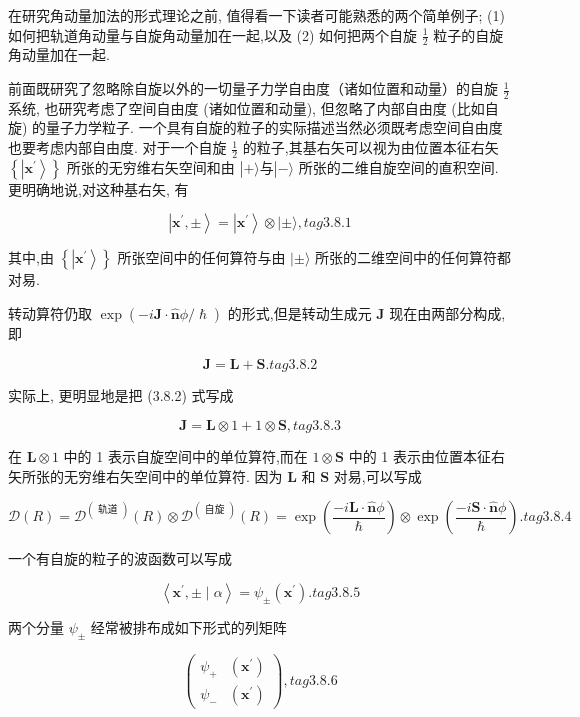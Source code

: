 在研究角动量加法的形式理论之前, 值得看一下读者可能熟悉的两个简单例子; (1) 如何把轨道角动量与自旋角动量加在一起,以及 (2) 如何把两个自旋 $\frac{1}{2}$ 粒子的自旋角动量加在一起.

前面既研究了忽略除自旋以外的一切量子力学自由度（诸如位置和动量）的自旋 $\frac{1}{2}$ 系统, 也研究考虑了空间自由度 (诸如位置和动量), 但忽略了内部自由度 (比如自旋) 的量子力学粒子. 一个具有自旋的粒子的实际描述当然必须既考虑空间自由度也要考虑内部自由度. 对于一个自旋 $\frac{1}{2}$ 的粒子,其基右矢可以视为由位置本征右矢 $\left\{ \left| {\mathbf{x}}^{\prime }\right\rangle \right\}$ 所张的无穷维右矢空间和由 $\left| {+\rangle \text{与}}\right| - \rangle$ 所张的二维自旋空间的直积空间. 更明确地说,对这种基右矢, 有

$$
\left| {{\mathbf{x}}^{\prime }, \pm }\right\rangle = \left| {\mathbf{x}}^{\prime }\right\rangle \otimes | \pm \rangle , tag{3.8.1}
$$

其中,由 $\left\{ \left| {\mathbf{x}}^{\prime }\right\rangle \right\}$ 所张空间中的任何算符与由 $| \pm \rangle$ 所张的二维空间中的任何算符都对易.

转动算符仍取 $\exp \left( {-i\mathbf{J} \cdot \widehat{\mathbf{n}}\phi /\hslash }\right)$ 的形式,但是转动生成元 $\mathbf{J}$ 现在由两部分构成,即

$$
\mathbf{J} = \mathbf{L} + \mathbf{S}. tag{3.8.2}
$$

实际上, 更明显地是把 (3.8.2) 式写成

$$
\mathbf{J} = \mathbf{L} \otimes 1 + 1 \otimes \mathbf{S}, tag{3.8.3}
$$

在 $\mathbf{L} \otimes 1$ 中的 1 表示自旋空间中的单位算符,而在 $1 \otimes \mathbf{S}$ 中的 1 表示由位置本征右矢所张的无穷维右矢空间中的单位算符. 因为 $\mathbf{L}$ 和 $\mathbf{S}$ 对易,可以写成

$$
\mathcal{D}\left( R\right) = {\mathcal{D}}^{\left( \text{ 轨道 }\right) }\left( R\right) \otimes {\mathcal{D}}^{\left( \text{ 自旋 }\right) }\left( R\right) = \exp \left( \frac{-i\mathbf{L} \cdot \widehat{\mathbf{n}}\phi }{\hslash }\right) \otimes \exp \left( \frac{-i\mathbf{S} \cdot \widehat{\mathbf{n}}\phi }{\hslash }\right) . tag{3.8.4}
$$

一个有自旋的粒子的波函数可以写成

$$
\left\langle {{\mathbf{x}}^{\prime }, \pm \mid \alpha }\right\rangle = {\psi }_{ \pm }\left( {\mathbf{x}}^{\prime }\right) . tag{3.8.5}
$$

两个分量 ${\psi }_{ \pm }$ 经常被排布成如下形式的列矩阵

$$
\left( \begin{array}{ll} {\psi }_{ + } & \left( {\mathbf{x}}^{\prime }\right) \\ {\psi }_{ - } & \left( {\mathbf{x}}^{\prime }\right) \end{array}\right) , tag{3.8.6}
$$

